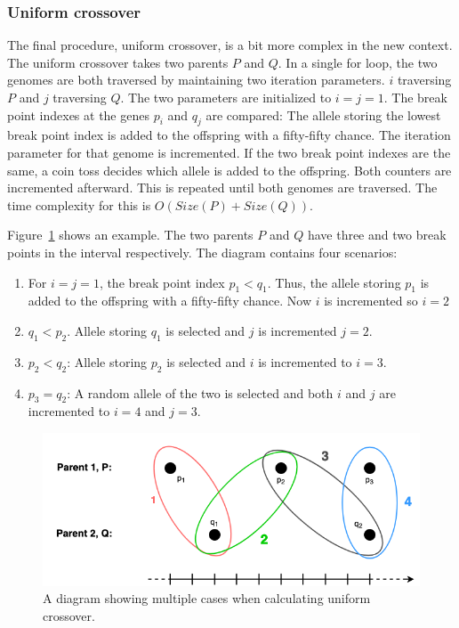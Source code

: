 
\subsubsection{Uniform crossover} \label{sec:uniform-crossover}

The final procedure, uniform crossover, is a bit more complex in the new
context. The uniform crossover takes two parents $P$ and $Q$. In a single for
loop, the two genomes are both traversed by maintaining two iteration
parameters. $i$ traversing $P$ and $j$ traversing $Q$. The two parameters are
initialized to $i = j = 1$. The break point indexes at the genes $p_i$ and $q_j$
are compared: The allele storing the lowest break point index is added to the
offspring with a fifty-fifty chance. The iteration parameter for that genome is
incremented. If the two break point indexes are the same, a coin toss decides
which allele is added to the offspring. Both counters are incremented afterward.
This is repeated until both genomes are traversed. The time complexity for this
is $O(Size(P) + Size(Q))$. 

Figure~\ref{fig:uniform-crossover} shows an example. The two parents $P$ and $Q$
have three and two break points in the interval respectively. The diagram
contains four scenarios:

\begin{enumerate}
    \item For $i = j = 1$, the break point index $p_1 < q_1$. Thus, the allele
    storing $p_1$ is added to the offspring with a fifty-fifty chance. Now $i$
    is incremented so $i = 2$ 
    
    \item $q_1 < p_2$. Allele storing $q_1$ is selected and $j$ is incremented
    $j = 2$. 
    
    \item $p_2 < q_2$: Allele storing $p_2$ is selected and $i$ is incremented 
    to $i = 3$. 
    
    \item $p_3 = q_2$: A random allele of the two is selected and both $i$ and
    $j$ are incremented to $i = 4$ and $j = 3$. 
\end{enumerate}


\begin{figure}[h]
    \centering
    \includegraphics[width=.8\textwidth]{fig/uniform-crossover.png}
    \caption{A diagram showing multiple cases when calculating uniform crossover.}
    \label{fig:uniform-crossover}
\end{figure}


